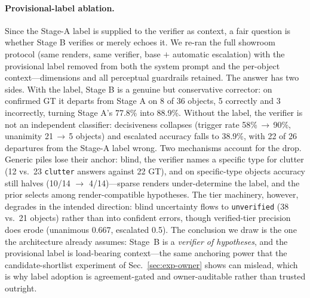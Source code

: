 \paragraph{Provisional-label ablation.}
Since the Stage-A label is supplied to the verifier as context, a fair
question is whether Stage B verifies or merely echoes it. We re-ran the
full showroom protocol (same renders, same verifier, base $+$ automatic
escalation) with the provisional label removed from both the system
prompt and the per-object context---dimensions and all perceptual
guardrails retained. The answer has two sides. With the label, Stage B
is a genuine but conservative corrector: on confirmed GT it departs from
Stage A on 8 of 36 objects, 5 correctly and 3 incorrectly, turning
Stage A's 77.8\% into 88.9\%. Without the label, the verifier is not an
independent classifier: decisiveness collapses (trigger rate
58\%\,$\rightarrow$\,90\%, unanimity 21\,$\rightarrow$\,5 objects) and
escalated accuracy falls to 38.9\%, with 22 of 26 departures from the
Stage-A label wrong. Two mechanisms account for the drop. Generic piles
lose their anchor: blind, the verifier names a specific type for
clutter (12 vs.\ 23 \texttt{clutter} answers against 22 GT), and on
specific-type objects accuracy still halves (10/14
$\rightarrow$ 4/14)---sparse renders under-determine the label, and the
prior selects among render-compatible hypotheses. The tier machinery,
however, degrades in the intended direction: blind uncertainty flows to
\texttt{unverified} (38 vs.\ 21 objects) rather than into confident
errors, though verified-tier precision does erode (unanimous 0.667,
escalated 0.5). The conclusion we draw is the one the architecture
already assumes: Stage~B is a \emph{verifier of hypotheses}, and the
provisional label is load-bearing context---the same anchoring power
that the candidate-shortlist experiment of Sec.~\ref{sec:exp-owner}
shows can mislead, which is why label adoption is agreement-gated and
owner-auditable rather than trusted outright.

